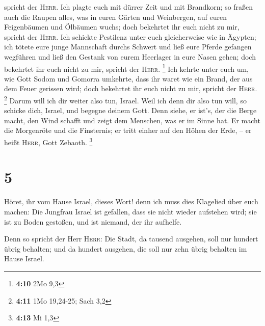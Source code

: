 spricht der \textsc{Herr}.  Ich plagte euch mit dürrer
Zeit und mit Brandkorn; so fraßen auch die Raupen alles, was in euren
Gärten und Weinbergen, auf euren Feigenbäumen und Ölbäumen wuchs; doch
bekehrtet ihr euch nicht zu mir, spricht der \textsc{Herr}.
 Ich schickte Pestilenz unter euch gleicherweise wie in
Ägypten; ich tötete eure junge Mannschaft durchs Schwert und ließ eure
Pferde gefangen wegführen und ließ den Gestank von eurem Heerlager in
eure Nasen gehen; doch bekehrtet ihr euch nicht zu mir, spricht der
\textsc{Herr}. \footnote{\textbf{4:10} 2Mo 9,3}  Ich
kehrte unter euch um, wie Gott Sodom und Gomorra umkehrte, dass ihr
waret wie ein Brand, der aus dem Feuer gerissen wird; doch bekehrtet ihr
euch nicht zu mir, spricht der \textsc{Herr}. \footnote{\textbf{4:11}
  1Mo 19,24-25; Sach 3,2}  Darum will ich dir weiter also
tun, Israel. Weil ich denn dir also tun will, so schicke dich, Israel,
und begegne deinem Gott.  Denn siehe, er ist's, der die
Berge macht, den Wind schafft und zeigt dem Menschen, was er im Sinne
hat. Er macht die Morgenröte und die Finsternis; er tritt einher auf den
Höhen der Erde, -- er heißt \textsc{Herr}, Gott Zebaoth. \footnote{\textbf{4:13}
  Mi 1,3}

\hypertarget{section-1}{%
\section{5}\label{section-1}}

 Höret, ihr vom Hause Israel, dieses Wort! denn ich muss
dies Klagelied über euch machen:  Die Jungfrau Israel ist
gefallen, dass sie nicht wieder aufstehen wird; sie ist zu Boden
gestoßen, und ist niemand, der ihr aufhelfe.

 Denn so spricht der Herr \textsc{Herr}: Die Stadt, da
tausend ausgehen, soll nur hundert übrig behalten; und da hundert
ausgehen, die soll nur zehn übrig behalten im Hause Israel.

